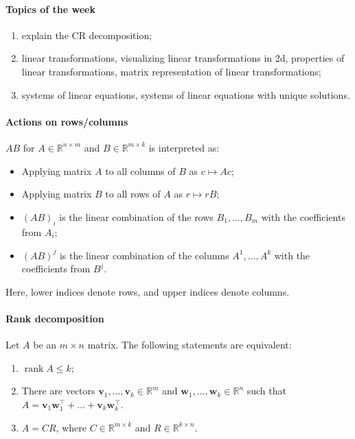 \documentclass{article}
\begin{document}
\paragraph{Topics of the week} 

\begin{enumerate}
    \item explain the CR decomposition;
    \item  linear transformations, visualizing linear transformations in 2d, properties of linear transformations, matrix representation of linear transformations;
    \item systems of linear equations, systems of linear equations with unique solutions.
\end{enumerate}

\paragraph{Actions on rows/columns} $AB$ for $A \in \mathbb R^{n \times m}$ and $B \in \mathbb R^{m \times k}$ is interpreted as:

\begin{itemize}
    \item Applying matrix $A$ to all columns of $B$ as $c \mapsto Ac$;
    \item Applying matrix $B$ to all rows of $A$ as $r \mapsto rB$;
    \item $(AB)_i$ is the linear combination of the rows $B_1,\dots,B_m$ with the coefficients from $A_i$;
    \item $(AB)^j$ is the linear combination of the columns $A^1,\dots,A^k$ with the coefficients from $B^j$.
\end{itemize}

Here, lower indices denote rows, and upper indices denote columns.

\paragraph{Rank decomposition} Let $A$ be an $m \times n$ matrix. The following statements are equivalent:
\begin{enumerate}
    \item $\operatorname{rank} A \leq k$;
    \item There are vectors $\mathbf{v}_1,\dots,\mathbf{v}_k \in \mathbb R^m$ and $\mathbf{w}_1,\dots,\mathbf{w}_k \in \mathbb R^n$ such that $A = \mathbf{v}_1 \mathbf{w}_1^\top + \dots + \mathbf{v}_k \mathbf{w}_k^\top$.
    \item $A = CR$, where $C \in \mathbb R^{m \times k}$ and $R \in \mathbb R^{k \times n}$.
\end{enumerate}
\end{document}
